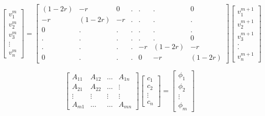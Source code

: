 \documentclass{article}
\begin{document}
\begin{equation}
  \begin{bmatrix}
    v_1^{m} \\
           v_2^m \\
           v_3^m \\
           \vdots \\
           v_n^m
  \end{bmatrix}
  =
  \begin{bmatrix}
    (1-2r) & -r & 0 & . & . & . & 0 \\
    -r & (1-2r) & -r & . & . & . & . \\
     0 & . & . & . & . & . &. \\
     . & . & . & . & . & . & 0 \\
     . & . & . & . & -r & (1-2r) & -r \\
     0 & . & . & . & 0 & -r & (1-2r)
  \end{bmatrix}
  \begin{bmatrix}
    v_1^{m+1}\\
v_2^{m+1}\\
v_3^{m+1}\\
.\\
.\\
v_n^{m+1} 
  \end{bmatrix}
\end{equation}

\[
 \begin{bmatrix}
   A_{11} & A_{12} & \dots    & A_{1n} \\
   A_{21} & A_{22} & \dots    & \vdots \\
   \vdots & \vdots & \vdots   & \vdots \\
   A_{m1} & \dots  & \dots    & A_{mn} 
 \end{bmatrix}
 \begin{bmatrix}
   c_{1}  \\
   c_{2}  \\
   \vdots  \\
   c_{n}   
 \end{bmatrix}
 =
 \begin{bmatrix}
   \phi _{1}  \\
   \phi _{2}  \\
   \vdots   \\
   \phi _{m}
 \end{bmatrix}
\]
\end{document}
